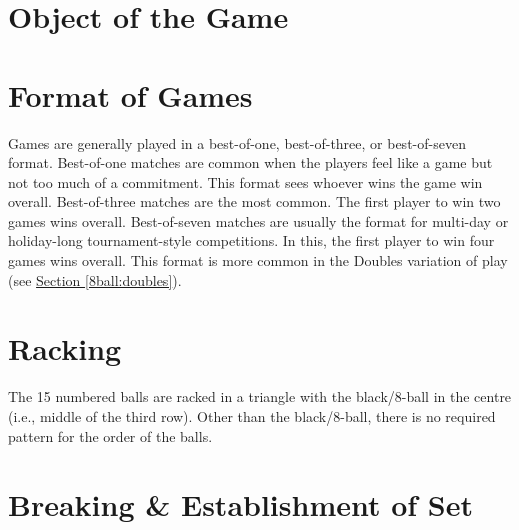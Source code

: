 
\section{Object of the Game} \label{8ball:description}

\section{Format of Games} \label{8ball:format}

 Games are generally played in a best-of-one, best-of-three, or best-of-seven format.%
\subruleitem Best-of-one matches are common when the players feel like a game but not too much of a commitment. This format sees whoever wins the game win overall.%
\subruleitem Best-of-three matches are the most common. The first player to win two games wins overall.%
\subruleitem Best-of-seven matches are usually the format for multi-day or holiday-long tournament-style competitions. In this, the first player to win four games wins overall. This format is more common in the Doubles variation of play (see \hyperref[8ball:doubles]{Section \ref*{8ball:doubles}}).%

\section{Racking} \label{8ball:racking}

 \RackingUp[8ball]%
\label{8ball:challengerracks}\DetermineWhoRacks%
\label{8ball:rackpos}\TableDiagram[8ball]%
\subruleitem The 15 numbered balls are racked in a triangle with the black/8-ball in the centre (i.e., middle of the third row). Other than the black/8-ball, there is no required pattern for the order of the balls.%
\subruleitem \TightlyPacked%
\subruleitem \RackPlacement[8ball]%
\subruleitem \RackingTool[8ball]%
\subruleitem \RackInspection[8ball]%

\section{Breaking \& Establishment of Set} \label{8ball:breaking}

